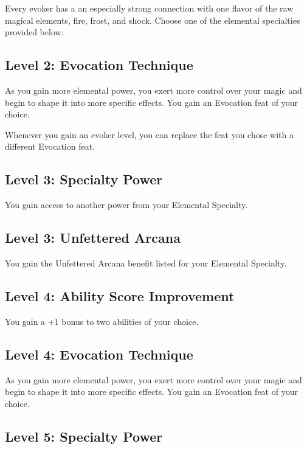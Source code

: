 \documentclass[12pt,letterpaper,twocolumn,openany,nodeprecatedcode,bg=none]{dndbook}
\begin{document}
Every evoker has a an especially strong connection with one flavor of
the raw magical elements, fire, frost, and shock. Choose one of the
elemental specialties provided below.

\subsection{Level 2: Evocation
Technique}\label{level-2-evocation-technique}

As you gain more elemental power, you exert more control over your magic
and begin to shape it into more specific effects. You gain an Evocation
feat of your choice.

Whenever you gain an evoker level, you can replace the feat you chose
with a different Evocation feat.

\subsection{Level 3: Specialty Power}\label{level-3-specialty-power}

You gain access to another power from your Elemental Specialty.

\subsection{Level 3: Unfettered Arcana}\label{level-3-unfettered-arcana}

You gain the Unfettered Arcana benefit listed for your Elemental
Specialty.

\subsection{Level 4: Ability Score
Improvement}\label{level-4-ability-score-improvement}

You gain a +1 bonus to two abilities of your choice.

\subsection{Level 4: Evocation
Technique}\label{level-4-evocation-technique}

As you gain more elemental power, you exert more control over your magic
and begin to shape it into more specific effects. You gain an Evocation
feat of your choice.

\subsection{Level 5: Specialty Power}\label{level-5-specialty-power}
\end{document}
